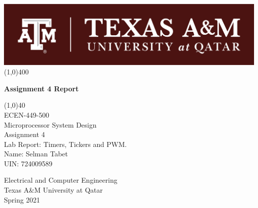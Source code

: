 \begin{titlepage}
\begin{center}
\includegraphics[scale=1.5]{Figures/TAMUQ.png}
\line(1,0){400}\\
[2mm]
\begin{huge}
\textbf{Assignment 4 Report}\\ 
\end{huge}
\begin{LARGE}
\line(1,0){40}\\
[1.5cm]
ECEN-449-500\\
Microprocessor System Design\\
[3cm]
Assignment 4\\
Lab Report: Timers, Tickers and PWM.\\ 
[2.5cm]
Name: Selman Tabet\\
UIN: 724009589\\
[4cm]
\end{LARGE}
\begin{large}
Electrical and Computer Engineering\\
Texas A&M University at Qatar\\
Spring 2021
\end{large}
\end{center} 
\end{titlepage}